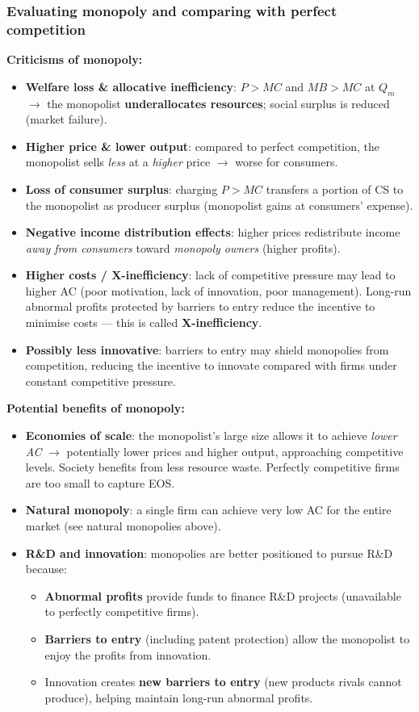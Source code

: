 \subsubsection*{Evaluating monopoly and comparing with perfect competition}
\textbf{Criticisms of monopoly:}
\begin{itemize}
  \item \textbf{Welfare loss \& allocative inefficiency}: $P > MC$ and $MB > MC$ at $Q_m$ $\to$ the monopolist \textbf{underallocates resources}; social surplus is reduced (market failure).
  \item \textbf{Higher price \& lower output}: compared to perfect competition, the monopolist sells \textit{less} at a \textit{higher} price $\to$ worse for consumers.
  \item \textbf{Loss of consumer surplus}: charging $P > MC$ transfers a portion of CS to the monopolist as producer surplus (monopolist gains at consumers' expense).
  \item \textbf{Negative income distribution effects}: higher prices redistribute income \textit{away from consumers} toward \textit{monopoly owners} (higher profits).
  \item \textbf{Higher costs / X-inefficiency}: lack of competitive pressure may lead to higher AC (poor motivation, lack of innovation, poor management). Long-run abnormal profits protected by barriers to entry reduce the incentive to minimise costs --- this is called \textbf{X-inefficiency}.
  \item \textbf{Possibly less innovative}: barriers to entry may shield monopolies from competition, reducing the incentive to innovate compared with firms under constant competitive pressure.
\end{itemize}
\textbf{Potential benefits of monopoly:}
\begin{itemize}
  \item \textbf{Economies of scale}: the monopolist's large size allows it to achieve \textit{lower AC} $\to$ potentially lower prices and higher output, approaching competitive levels. Society benefits from less resource waste. Perfectly competitive firms are too small to capture EOS.
  \item \textbf{Natural monopoly}: a single firm can achieve very low AC for the entire market (see natural monopolies above).
  \item \textbf{R\&D and innovation}: monopolies are better positioned to pursue R\&D because:
  \begin{itemize}
    \item \textbf{Abnormal profits} provide funds to finance R\&D projects (unavailable to perfectly competitive firms).
    \item \textbf{Barriers to entry} (including patent protection) allow the monopolist to enjoy the profits from innovation.
    \item Innovation creates \textbf{new barriers to entry} (new products rivals cannot produce), helping maintain long-run abnormal profits.
  \end{itemize}
\end{itemize}
